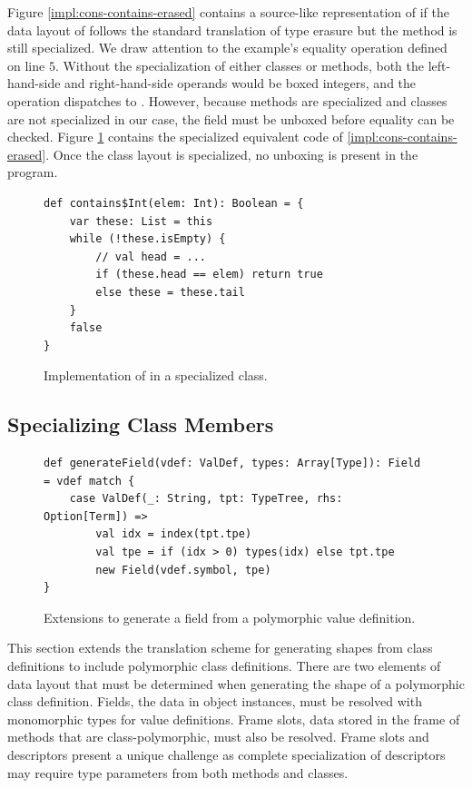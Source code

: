 Figure \ref{impl:cons-contains-erased} contains a source-like representation of  if the data layout of  follows the standard translation of type erasure but the method is still specialized.
We draw attention to the example's equality operation defined on line $5$.
Without the specialization of either classes or methods, both the left-hand-side and right-hand-side operands would be boxed integers, and the \scalainline{==} operation dispatches to .
However, because methods are specialized and classes are not specialized in our case, the  field must be unboxed before equality can be checked.
Figure \ref{impl:cons-contains-specialized} contains the specialized equivalent code of \ref{impl:cons-contains-erased}.
Once the class layout is specialized, no unboxing is present in the program.

\begin{figure}[!htb]
\begin{verbatim}
def contains$Int(elem: Int): Boolean = {
	var these: List = this
	while (!these.isEmpty) {
		// val head = ...
		if (these.head == elem) return true
		else these = these.tail
	}
	false
}	
\end{verbatim}
\caption{Implementation of  in a specialized  class.}
\label{impl:cons-contains-specialized}
\end{figure}

\subsection{Specializing Class Members}

\begin{figure}[!htb]
\begin{verbatim}
def generateField(vdef: ValDef, types: Array[Type]): Field = vdef match {
	case ValDef(_: String, tpt: TypeTree, rhs: Option[Term]) => 
		val idx = index(tpt.tpe)
		val tpe = if (idx > 0) types(idx) else tpt.tpe
		new Field(vdef.symbol, tpe)
}
\end{verbatim}
\caption{Extensions to generate a field from a polymorphic value definition.}
\label{impl:generate-poly-field}
\end{figure}

This section extends the translation scheme for generating shapes from class definitions to include polymorphic class definitions.
There are two elements of data layout that must be determined when generating the shape of a polymorphic class definition.
Fields, the data in object instances, must be resolved with monomorphic types for value definitions.
Frame slots, data stored in the frame of methods that are class-polymorphic, must also be resolved.
Frame slots and descriptors present a unique challenge as complete specialization of descriptors may require type parameters from both methods and classes.

